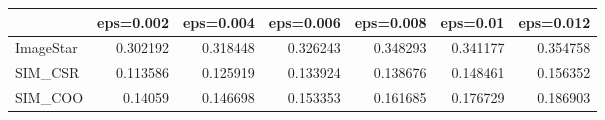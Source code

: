 \begin{tabular}{lrrrrrr}
\hline
           &   eps=0.002 &   eps=0.004 &   eps=0.006 &   eps=0.008 &   eps=0.01 &   eps=0.012 \\
\hline
 ImageStar &    0.302192 &    0.318448 &    0.326243 &    0.348293 &   0.341177 &    0.354758 \\
 SIM\_CSR   &    0.113586 &    0.125919 &    0.133924 &    0.138676 &   0.148461 &    0.156352 \\
 SIM\_COO   &    0.14059  &    0.146698 &    0.153353 &    0.161685 &   0.176729 &    0.186903 \\
\hline
\end{tabular}
